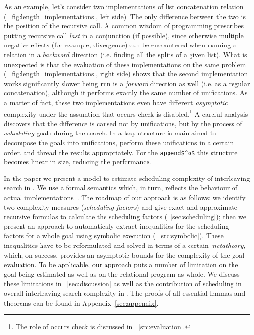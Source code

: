 As an example, let's consider two implementations of list concatenation relation (\figureword~\ref{fig:length_implementations}, left side). The only difference between the two is
the position of the recursive call. A common wizdom of \mK programming prescribes putting recursive call \emph{last} in a conjunction (if possible), since otherwise multiple
negative effects (for example, divergence) can be encountered when running a relation in a \emph{backward} direction (i.e. finding all the splits of a given list). What is unexpected
is that the evaluation of these implementations on the same problem (\figureword~\ref{fig:length_implementations}, right side) shows that the second implementation works significantly
slower being run is a \emph{forward} direction as well (i.e. as a regular concatenation), although it performs exactly the same number of unifications. As a matter of fact,
these two implementations even have different \emph{asymptotic} complexity under the assumtion that occurs check is disabled.\footnote{The role of occurs check is discussed in
\sectionword~\ref{src:evaluation}.}
A careful analysis discovers that the difference is caused not by unifications, but by the process of \emph{scheduling} goals during the search. In \mK a
lazy structure is maintained to decompose the goals into unifications, perform these unifications in a certain order, and thread the results appropriately. For the \lstinline|append$^o$|
this structure becomes linear in size, reducing the performance.

In the paper we present a model to estimate scheduling complexity of interleaving search in \mK. We use a formal semantics which, in turn, reflects the
behaviour of actual implementations~\cite{CertifiedSemantics}. The roadmap of our approach is as follows: we identify two complexity measures (\emph{scheduling factors}) and
give exact and approximate recursive formulas to calculate the scheduling factors (\sectionword~\ref{sec:scheduling}); then we present an approach to
automaticaly extract inequalities for the scheduling factors for a whole goal using symbolic execution (\sectionword~\ref{src:symbolic}). These inequalities have
to be reformulated and solved in terms of a certain \emph{metatheory}, which, on success, provides an asymptotic bounds for the complexity of
the goal evaluation. To be applicable, our approach puts a number of limitation on the goal being estimated as well as on the relational program as whole. We discuss
these limitations in \sectionword~\ref{sec:discussion} as well as the contribution of scheduling in overall interleaving search complexity in \mK. The proofs of
all essential lemmas and theorems can be found in Appendix~\ref{sec:appendix}.


